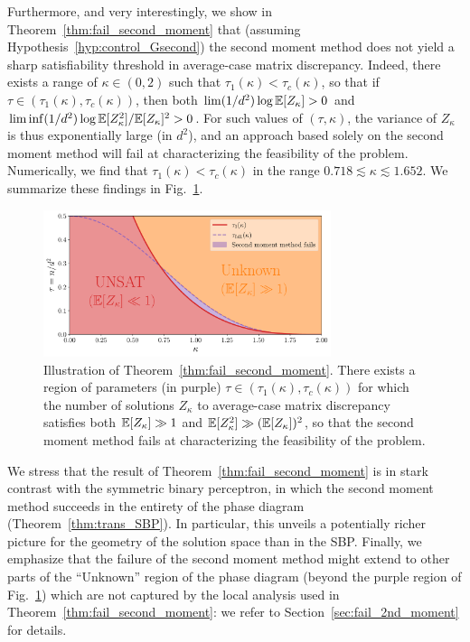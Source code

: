 \myskip
Furthermore, and very interestingly, we show in Theorem~\ref{thm:fail_second_moment} that 
(assuming Hypothesis~\ref{hyp:control_Gsecond}) the second moment method does not yield a sharp satisfiability threshold in average-case matrix discrepancy. 
Indeed, there exists a range of $\kappa \in (0,2)$ such that 
$\tau_1(\kappa) < \tau_{c}(\kappa)$, so that if $\tau \in (\tau_1(\kappa), \tau_c(\kappa))$, 
then both $\lim (1/d^2) \log \mathbb{E}[Z_\kappa] > 0$ and $\liminf (1/d^2) \log \mathbb{E}[Z_\kappa^2]/\mathbb{E}[Z_\kappa]^2 > 0$.
For such values of $(\tau, \kappa)$, the variance of $Z_\kappa$ is thus exponentially large (in $d^2$), and an approach based solely on the second moment method 
will fail at characterizing the feasibility of the problem.
Numerically, we find  that $\tau_1(\kappa) < \tau_c(\kappa)$ in the range $0.718 \lesssim \kappa \lesssim 1.652$. We summarize these findings in Fig.~\ref{fig:fail_second_moment}.
\begin{figure}[!t]
    \centering
    \includegraphics[width=0.75\textwidth]{figures/fail_second_moment.pdf}
    \caption{
        Illustration of Theorem~\ref{thm:fail_second_moment}. There exists a region of parameters (in purple) $\tau \in (\tau_1(\kappa), \tau_c(\kappa))$
        for which the number of solutions $Z_\kappa$ to average-case matrix discrepancy satisfies both $\mathbb{E}[Z_\kappa] \gg 1$ and $\mathbb{E}[Z_\kappa^2] \gg (\mathbb{E}[Z_\kappa])^2$,
        so that the second moment method fails at characterizing the feasibility of the problem.
    \label{fig:fail_second_moment}}
\end{figure}

\myskip
We stress that the result of Theorem~\ref{thm:fail_second_moment} is in stark contrast with the symmetric binary perceptron, in 
which the second moment method succeeds in the entirety of the phase diagram (Theorem~\ref{thm:trans_SBP}).
In particular, this unveils a potentially richer picture for the geometry of the solution space than in the SBP.
Finally, we emphasize that the failure of the second moment method might extend to other parts of the ``Unknown'' region of the phase diagram
(beyond the purple region of Fig.~\ref{fig:fail_second_moment}) 
which are not captured by the local analysis used in Theorem~\ref{thm:fail_second_moment}: we refer to Section~\ref{sec:fail_2nd_moment} for details.

